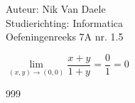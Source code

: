 \documentclass[a4paper]{article}
\newcommand{\llim}{\lim\limits}
\begin{document}
  
\noindent \large Auteur: Nik Van Daele \\
\noindent \large Studierichting: Informatica\\
\noindent \large Oefeningenreeks 7A nr. 1.5\\

\medskip

\normalsize

$\llim_{(x,y) \rightarrow (0,0)} \dfrac{x+y}{1+y} = \dfrac{0}{1} = 0$\\

\begin{thebibliography}{999}
\end{thebibliography}
\end{document}
